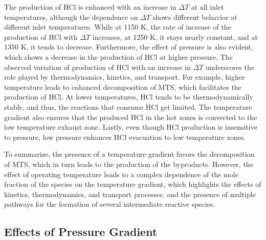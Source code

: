 \documentclass[final, letterpaper, square, comma, numbers, sort&compress]{elsarticle}
\begin{document}
The production of HCl is enhanced with an increase in $\Delta T$ at all inlet temperatures, although the dependence on $\Delta T$ shows different behavior at different inlet temperatures. While at 1150 K, the rate of increase of the production of HCl with $\Delta T$ increases, at 1250 K, it stays nearly constant, and at 1350 K, it tends to decrease. Furthermore, the effect of pressure is also evident, which shows a decrease in the production of HCl at higher pressure. The observed variation of production of HCl with an increase in $\Delta T$ underscores the role played by thermodynamics, kinetics, and transport. For example, higher temperature leads to enhanced decomposition of MTS, which facilitates the production of HCl. At lower temperatures, HCl tends to be thermodynamically stable, and thus, the reactions that consume HCl get limited. The temperature gradient also ensures that the produced HCl in the hot zones is convected to the low temperature exhaust zone. Lastly, even though HCl production is insensitive to pressure, low pressure enhances HCl evacuation to low temperature zones.

To summarize, the presence of a temperature gradient favors the decomposition of MTS, which in turn leads to the production of the byproducts. However, the effect of operating temperature leads to a complex dependence of the mole fraction of the species on the temperature gradient, which highlights the effects of kinetics, thermodynamics, and transport processes, and the presence of multiple pathways for the formation of several intermediate reactive species.

\subsection{Effects of Pressure Gradient}
\end{document}
